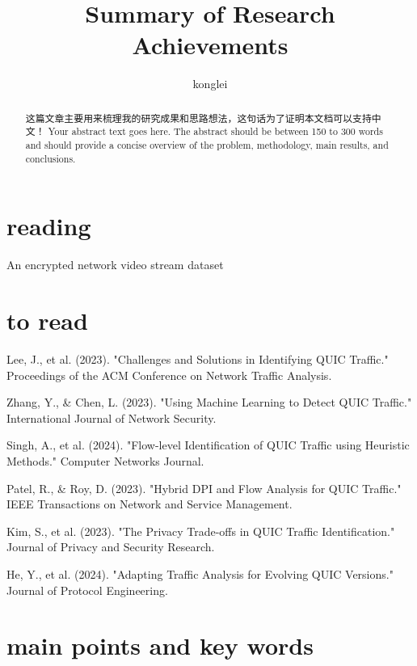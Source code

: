 \documentclass[a4paper, 10pt]{article}
\date{}
\title{
	Summary of Research Achievements %
}
\author[1,*]{konglei}
\affil[1]{Computer Science and Technology, Zhejiang University, Hangzhou, China}
\begin{document}
 
\begin{CJK}{UTF8}{gbsn} %
	\maketitle %
	\begin{abstract}
	这篇文章主要用来梳理我的研究成果和思路想法，这句话为了证明本文档可以支持中文！ %
	Your abstract text goes here. The abstract should be between 150 to 300 words and should provide a concise overview of the problem, methodology, main results, and conclusions.
\end{abstract}

	\section{reading}
	An encrypted network video stream dataset
	
	
	
	
	
	
	
	\section{to read}

Lee, J., et al. (2023). "Challenges and Solutions in Identifying QUIC Traffic." Proceedings of the ACM Conference on Network Traffic Analysis.

Zhang, Y., \& Chen, L. (2023). "Using Machine Learning to Detect QUIC Traffic." International Journal of Network Security.

Singh, A., et al. (2024). "Flow-level Identification of QUIC Traffic using Heuristic Methods." Computer Networks Journal.

Patel, R., \& Roy, D. (2023). "Hybrid DPI and Flow Analysis for QUIC Traffic." IEEE Transactions on Network and Service Management.

Kim, S., et al. (2023). "The Privacy Trade-offs in QUIC Traffic Identification." Journal of Privacy and Security Research.

He, Y., et al. (2024). "Adapting Traffic Analysis for Evolving QUIC Versions." Journal of Protocol Engineering.
	
	\section*{main points and key words}
	
	
	

\end{CJK}
\end{document}
